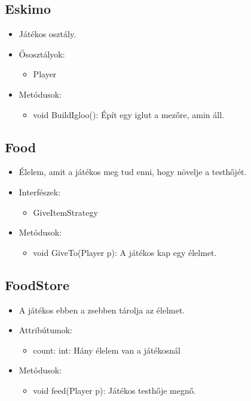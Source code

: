 \subsection{Eskimo}
\begin{itemize}
	\item Játékos osztály.
	
	\item Ősosztályok:
	\begin{itemize}
		\item Player
	\end{itemize}
\item Metódusok:
\begin{itemize}
	\item void BuildIgloo(): Épít egy iglut a mezőre, amin áll.
\end{itemize}
\end{itemize}

\subsection{Food}
\begin{itemize}
	\item Élelem, amit a játékos meg tud enni, hogy növelje a testhőjét.
	
\item Interfészek:
\begin{itemize}
	\item GiveItemStrategy
\end{itemize}

\item Metódusok:
\begin{itemize}
	\item void GiveTo(Player p): A játékos kap egy élelmet.
\end{itemize}
\end{itemize}

\subsection{FoodStore}
\begin{itemize}
	\item A játékos ebben a zsebben tárolja az élelmet.

\item Attribútumok:

\begin{itemize}
	\item count: int: Hány élelem van a játékosnál

\end{itemize}
\item Metódusok:
\begin{itemize}
	\item void feed(Player p): Játékos testhője megnő.
\end{itemize}
\end{itemize}

